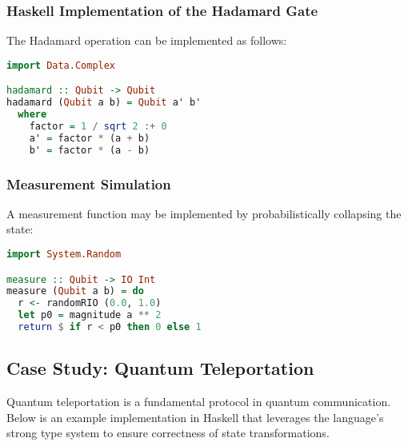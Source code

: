 \documentclass[12pt]{article}
\begin{document}
\subsubsection{Haskell Implementation of the Hadamard Gate}
The Hadamard operation can be implemented as follows:
\begin{lstlisting}[language=Haskell]
import Data.Complex

hadamard :: Qubit -> Qubit
hadamard (Qubit a b) = Qubit a' b'
  where
    factor = 1 / sqrt 2 :+ 0
    a' = factor * (a + b)
    b' = factor * (a - b)
\end{lstlisting}

\subsubsection{Measurement Simulation}
A measurement function may be implemented by probabilistically collapsing the state:
\begin{lstlisting}[language=Haskell]
import System.Random

measure :: Qubit -> IO Int
measure (Qubit a b) = do
  r <- randomRIO (0.0, 1.0)
  let p0 = magnitude a ** 2
  return $ if r < p0 then 0 else 1
\end{lstlisting}

\subsection{Case Study: Quantum Teleportation}
Quantum teleportation is a fundamental protocol in quantum communication. Below is an example implementation in Haskell that leverages the language's strong type system to ensure correctness of state transformations.
\end{document}
